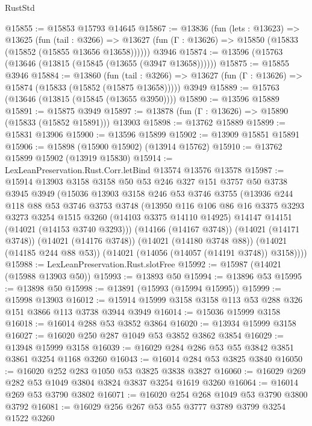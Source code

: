 \begin{lexlean}{RustStd}
\begin{coremodule}
@15855 := @15853 @15793 @14645
@15867 := @13836
    (fun (lets : @13623) =>
    @13625
      (fun (tail : @3266) =>
      @13627 (fun (Γ : @13626) => @15850 (@15833 (@15852 (@15855 @13656 @13658))))))
    @3946
@15874 := @13596 (@15763 (@13646 (@13815 (@15845 (@13655 (@3947 @13658))))))
@15875 := @15855 @3946
@15884 := @13860
    (fun (tail : @3266) => @13627 (fun (Γ : @13626) => @15874 (@15833 (@15852 (@15875 @13658)))))
    @3949
@15889 := @15763 (@13646 (@13815 (@15845 (@13655 @3950))))
@15890 := @13596 @15889
@15891 := @15875 @3949
@15897 := @13878 (fun (Γ : @13626) => @15890 (@15833 (@15852 @15891))) @13903
@15898 := @13762 @15889
@15899 := @15831 @13906
@15900 := @13596 @15899
@15902 := @13909 @15851 @15891
@15906 := @15898 (@15900 @15902) (@13914 @15762)
@15910 := @13762 @15899 @15902 (@13919 @15830)
@15914 := LexLeanPreservation.Rust.Corr.letBind @13574 @13576 @13578
@15987 := @15914
    @13903
    @3158
    @3158
    @50
    @53
    @246
    @327
    @151
    @3757
    @50
    @3738
    @3945
    @3949
    (@15036
      @13903
      @3158
      @246
      @53
      @3746
      @3755
      (@13936
        @244
        @118
        @88
        @53
        @3746
        @3753
        @3748
        (@13950
          @116
          @106
          @86
          @16
          @3375
          @3293
          @3273
          @3254
          @1515
          @3260
          (@14103 @3375 @14110 @14925)
          @14147
          @14151
          (@14021 (@14153 @3740 @3293)))
        (@14166 (@14167 @3748))
        (@14021 (@14171 @3748))
        (@14021 (@14176 @3748))
        (@14021 (@14180 @3748 @88))
        (@14021 (@14185 @244 @88 @53))
        (@14021 (@14056 (@14057 (@14191 @3748)) @3158))))
@15988 := LexLeanPreservation.Rust.slotFree
@15992 := @15987 (@14021 (@15988 @13903 @50))
@15993 := @13893 @50
@15994 := @13896 @53
@15995 := @13898 @50
@15998 := @13891 (@15993 (@15994 @15995))
@15999 := @15998 @13903
@16012 := @15914 @15999 @3158 @3158 @113 @53 @288 @326 @151 @3866 @113 @3738 @3944 @3949
@16014 := @15036 @15999 @3158
@16018 := @16014 @288 @53 @3852 @3864
@16020 := @13934 @15999 @3158
@16027 := @16020 @250 @287 @1049 @53 @3852 @3862 @3854
@16029 := @13948 @15999 @3158
@16039 := @16029 @284 @286 @53 @55 @3842 @3851 @3861 @3254 @1168 @3260
@16043 := @16014 @284 @53 @3825 @3840
@16050 := @16020 @252 @283 @1050 @53 @3825 @3838 @3827
@16060 := @16029 @269 @282 @53 @1049 @3804 @3824 @3837 @3254 @1619 @3260
@16064 := @16014 @269 @53 @3790 @3802
@16071 := @16020 @254 @268 @1049 @53 @3790 @3800 @3792
@16081 := @16029 @256 @267 @53 @55 @3777 @3789 @3799 @3254 @1522 @3260

\end{coremodule}
\end{lexlean}
